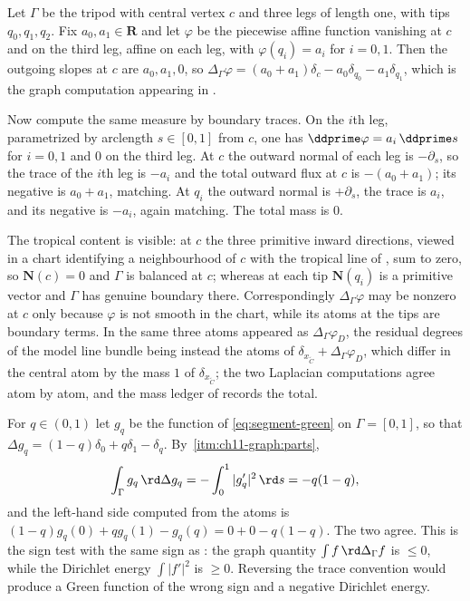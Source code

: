 \begin{example}
\label{ex:ch11-graph-tripod-check}
Let $\Gamma$ be the tripod with central vertex $c$ and three legs of length
one, with tips $q_0,q_1,q_2$.  Fix $a_0,a_1\in\mathbf R$ and let $\varphi$
be the piecewise affine function vanishing at $c$ and on the third leg,
affine on each leg, with $\varphi(q_i)=a_i$ for $i=0,1$.  Then the outgoing
slopes at $c$ are $a_0,a_1,0$, so
$\Delta_\Gamma\varphi=(a_0+a_1)\delta_c-a_0\delta_{q_0}-a_1\delta_{q_1}$,
which is the graph computation appearing in .

Now compute the same measure by boundary traces.  On the $i$th leg,
parametrized by arclength $s\in[0,1]$ from $c$, one has
$\ddprime\varphi=a_i\,\ddprime s$ for $i=0,1$ and $0$ on the third leg.  At
$c$ the outward normal of each leg is $-\partial_s$, so the trace of the
$i$th leg is $-a_i$ and the total outward flux at $c$ is $-(a_0+a_1)$; its
negative is $a_0+a_1$, matching.  At $q_i$ the outward normal is
$+\partial_s$, the trace is $a_i$, and its negative is $-a_i$, again
matching.  The total mass is $0$.

The tropical content is visible: at $c$ the three primitive inward
directions, viewed in a chart identifying a neighbourhood of $c$ with the
tropical line of , sum to zero, so
$\mathbf N(c)=0$ and $\Gamma$ is balanced at $c$; whereas at each tip
$\mathbf N(q_i)$ is a primitive vector and $\Gamma$ has genuine boundary
there.  Correspondingly $\Delta_\Gamma\varphi$ may be nonzero at $c$ only
because $\varphi$ is not smooth in the chart, while its atoms at the tips
are boundary terms.  In  the same three atoms
appeared as $\Delta_\Gamma\varphi_D$, the residual degrees of the model line
bundle being instead the atoms of
$\delta_{x_{\widetilde C}}+\Delta_\Gamma\varphi_D$, which differ in the
central atom by the mass $1$ of $\delta_{x_{\widetilde C}}$; the two
Laplacian computations agree atom by atom, and the mass ledger of
 records the total.
\end{example}

\begin{example}
\label{ex:ch11-green-function-check}
For $q\in(0,1)$ let $g_q$ be the function of
\eqref{eq:segment-green} on $\Gamma=[0,1]$, so that
$\Delta g_q=(1-q)\delta_0+q\delta_1-\delta_q$.  By
\,\cref{itm:ch11-graph:parts},
\[
 \int_\Gamma g_q\,\rd\Delta g_q=-\int_0^1|g_q'|^2\,\rd s=-q(1-q),
\]
and the left-hand side computed from the atoms is
$(1-q)g_q(0)+qg_q(1)-g_q(q)=0+0-q(1-q)$.  The two agree.  This is the sign
test with the same sign as : the graph
quantity $\int f\,\rd\Delta_\Gamma f$ is $\le0$, while the Dirichlet energy
$\int|f'|^2$ is $\ge0$.  Reversing the trace convention would produce a
Green function of the wrong sign and a negative Dirichlet energy.
\end{example}

